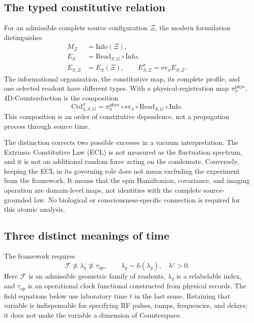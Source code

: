 \documentclass[11pt,a4paper]{article}
\theoremstyle{definition}
\theoremstyle{remark}
\newcommand{\topc}{\tau_{\mathrm{op}}}
\begin{document}
\subsection{The typed constitutive relation}
For an admissible complete source configuration $\Xi$, the modern formulation distinguishes
\begin{align}
 M_\Xi&=\mathrm{Info}(\Xi),\nonumber\\
 E_S&=\mathrm{Read}_{S,G}\circ\mathrm{Info},\nonumber\\
 E_{S,\Xi}&=E_S(\Xi),\qquad
 E^\sigma_{S,\Xi}=\mathrm{ev}_\sigma E_{S,\Xi}.
 \label{eq:ecl}
\end{align}
The informational organization, the constitutive map, its complete profile, and one selected readout have different types. With a physical-registration map $\pi^{\mathrm{phys}}_\sigma$, 4D-Counterduction is the composition
\begin{equation}
 \mathrm{Ctd}^{\sigma}_{4,S,G}
 =\pi^{\mathrm{phys}}_\sigma\circ\mathrm{ev}_\sigma
   \circ\mathrm{Read}_{S,G}\circ\mathrm{Info}.
 \label{eq:counterduction}
\end{equation}
This composition is an order of constitutive dependence, not a propagation process through source time.\cite{foundation}

The distinction corrects two possible excesses in a vacuum interpretation. The Extrinsic Constitutive Law (ECL) is not measured as the fluctuation spectrum, and it is not an additional random force acting on the condensate. Conversely, keeping the ECL in its governing role does not mean excluding the experiment from the framework. It means that the spin Hamiltonian, covariance, and imaging operation are domain-level maps, not identities with the complete source-grounded law. No biological or consciousness-specific connection is required for this atomic analysis.\cite{foundation}

\subsection{Three distinct meanings of time}
The framework requires
\begin{equation}
 \mathcal F\not\equiv\lambda_g\not\equiv\topc,
 \qquad \lambda_g\sim h(\lambda_g),\quad h'>0.
 \label{eq:time_types}
\end{equation}
Here $\mathcal F$ is an admissible geometric family of readouts, $\lambda_g$ is a relabelable index, and $\topc$ is an operational clock functional constructed from physical records. The field equations below use laboratory time $t$ in the last sense. Retaining that variable is indispensable for specifying RF pulses, ramps, frequencies, and delays; it does not make the variable a dimension of Counterspace.\cite{foundation,minkowski}
\end{document}
